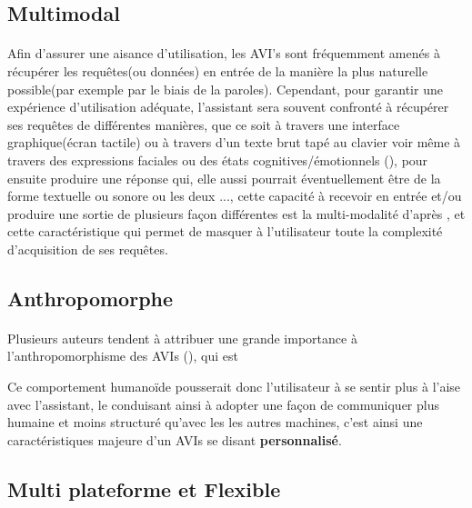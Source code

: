 \subsection{Multimodal }
\paragraph{}
Afin d'assurer une aisance d'utilisation, les AVI's sont fréquemment amenés à récupérer les requêtes(ou données) en entrée de la manière la plus naturelle possible(par exemple par le biais de la paroles). Cependant, pour garantir une expérience d'utilisation adéquate, l'assistant sera souvent confronté à récupérer ses requêtes de différentes manières, que ce soit à travers une interface graphique(écran tactile) ou à travers d'un texte brut tapé au clavier voir même à travers des expressions faciales ou des états cognitives/émotionnels (\cite{Dingler2016}), pour ensuite produire une réponse qui, elle aussi pourrait éventuellement être de la forme textuelle ou sonore ou les deux ..., cette capacité à recevoir en entrée et/ou produire une sortie de plusieurs façon différentes est la multi-modalité d'après \cite{Luger2016}, et cette caractéristique qui permet de masquer à l'utilisateur toute la complexité d'acquisition de ses requêtes.

\subsection{Anthropomorphe}\label{antropo}
\paragraph{}
Plusieurs auteurs tendent à attribuer une grande importance à l'anthropomorphisme des AVIs (\cite{virtualbutler}), qui est 
\begin{quote}
	\cite{alexabff}
\end{quote}

\par Ce comportement humanoïde pousserait donc l'utilisateur à se sentir plus à l'aise avec l'assistant, le conduisant ainsi à adopter une façon de communiquer plus humaine et moins structuré qu'avec les les autres machines, c'est ainsi une caractéristiques majeure d'un AVIs se disant \textbf{personnalisé}.
\subsection{Multi plateforme et Flexible }
